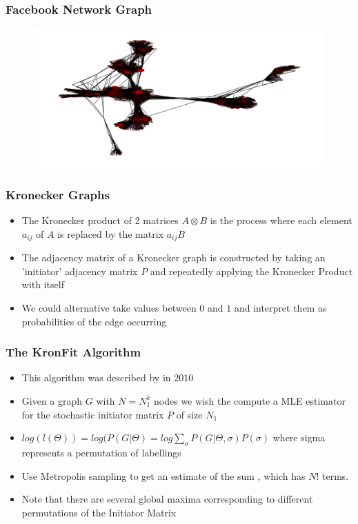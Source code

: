 \documentclass{beamer}
\begin{document}
\begin{frame}
\frametitle{Facebook Network Graph}
\begin{figure}
\includegraphics[width=\textwidth,height=\textheight,keepaspectratio]{facebook_connectivity_graph}
\end{figure}
\end{frame}


\begin{frame}
\frametitle{Kronecker Graphs}
\begin{itemize}
\item The Kronecker product of 2 matrices $A \otimes B$ is the process where each element $a_{ij}$ of $A$ is replaced by the matrix $a_{ij}B$
\item The adjacency matrix of a Kronecker graph is constructed by taking an 'initiator' adjacency matrix $P$ and repeatedly applying the Kronecker Product with itself
\item We could alternative take values between $0$ and $1$ and interpret them as probabilities of the edge occurring
\end{itemize}
\end{frame}


\begin{frame}
\frametitle{The KronFit Algorithm}
\begin{itemize}
\item This algorithm was described by \cite{ghahramani2010} in 2010
\item Given a graph $G$ with $N = N_1^k$ nodes we wish the compute a MLE estimator for the stochastic initiator matrix $P$ of size $N_1$
\item $log(l(\Theta)) = log(P(G|\Theta) = log \sum_{\sigma} P(G|\Theta, \sigma)P(\sigma)$ where sigma represents a permutation of labellings
\item Use Metropolis sampling to get an estimate of the sum , which has $N!$ terms.
\item Note that there are several global maxima corresponding to different permutations of the Initiator Matrix

\end{itemize}
\end{frame}
\end{document}
